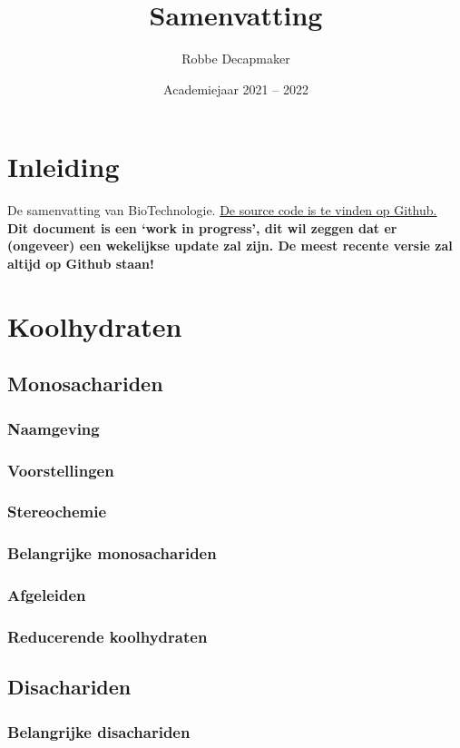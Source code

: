 \documentclass[a4paper,kul]{kulakarticle} %
\date{Academiejaar 2021 -- 2022}
\title{Samenvatting}
\author{Robbe Decapmaker}
\begin{document}
\maketitle

\section*{Inleiding}

De samenvatting van BioTechnologie. \href{https://github.com/debber1/BioTech}{De source code is te vinden op Github.}\\
\textbf{Dit document is een `work in progress', dit wil zeggen dat er (ongeveer) een wekelijkse update zal zijn. De meest recente versie zal altijd op Github staan!}
\tableofcontents
\section{Koolhydraten}
\subsection{Monosachariden}
\subsubsection{Naamgeving}
\subsubsection{Voorstellingen}
\subsubsection{Stereochemie}
\subsubsection{Belangrijke monosachariden}
\subsubsection{Afgeleiden}
\subsubsection{Reducerende koolhydraten}
\subsection{Disachariden}
\subsubsection{Belangrijke disachariden}
\end{document}
